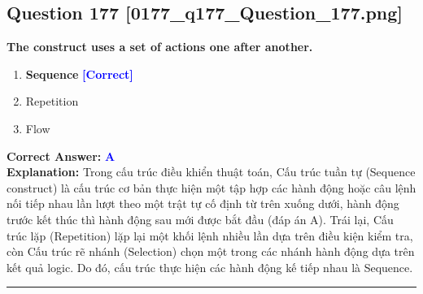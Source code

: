 \documentclass[11pt,a4paper]{article}
\begin{document}
\begin{minipage}{\textwidth}
\subsection*{Question 177 \quad \footnotesize{[0177\_q177\_Question\_177.png]}}
\noindent \textbf{The construct uses a set of actions one after another.}

\begin{enumerate}[label=\Alph*.]
    \item \textbf{Sequence} \hfill \textcolor{blue}{\textbf{[Correct]}}
    \item Repetition
    \item Flow
\end{enumerate}

\noindent \textbf{Correct Answer:} \textcolor{blue}{\textbf{A}} \\[2pt]
\noindent \textbf{Explanation:} Trong cấu trúc điều khiển thuật toán, Cấu trúc tuần tự (Sequence construct) là cấu trúc cơ bản thực hiện một tập hợp các hành động hoặc câu lệnh nối tiếp nhau lần lượt theo một trật tự cố định từ trên xuống dưới, hành động trước kết thúc thì hành động sau mới được bắt đầu (đáp án A). Trái lại, Cấu trúc lặp (Repetition) lặp lại một khối lệnh nhiều lần dựa trên điều kiện kiểm tra, còn Cấu trúc rẽ nhánh (Selection) chọn một trong các nhánh hành động dựa trên kết quả logic. Do đó, cấu trúc thực hiện các hành động kế tiếp nhau là Sequence.

\par\vspace{0.3cm}
\hrule
\vspace{0.3cm}
\end{minipage}
\end{document}
